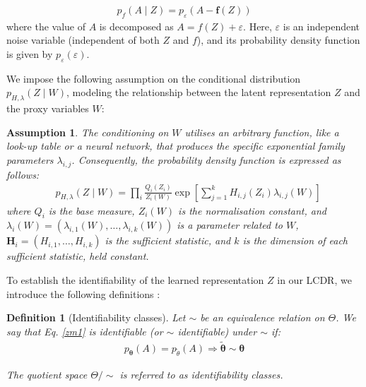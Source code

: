 \documentclass[sigconf]{acmart}
\newtheorem{assumption}{Assumption}		%
\newtheorem{definition}{Definition}
\begin{document}
\begin{equation}
\begin{split}
\label{zm2}
p_f\left({A} \mid {Z}\right)=p_{\varepsilon}\left({A}-\mathbf{f}({Z})\right)
\end{split}
\end{equation}
where the value of \( {A} \) is decomposed as \( {A} = f({Z}) + \varepsilon \). Here, \( \varepsilon \) is an independent noise variable (independent of both \( {Z} \) and \( f \)), and its probability density function is given by \( p_{\varepsilon}(\varepsilon) \).


We impose the following assumption on the conditional distribution $p_{H, \lambda}({Z} \mid {W})$, modeling the relationship between the latent representation $Z$ and the proxy variables $W$:

\begin{assumption}
\label{assumption 1}
The conditioning on ${W}$ utilises an arbitrary function, like a look-up table or a neural network, that produces the specific exponential family parameters $\lambda_{i, j}$. Consequently, the probability density function is expressed as follows:
\begin{equation}
\begin{split}
\label{zm3}
& p_{H, \lambda}({Z} \mid {W})= \prod_i \frac{Q_i\left({Z}_{i}\right)}{Z_i({W})} \exp \left[\sum_{j=1}^k H_{i, j}\left({Z}_{i}\right) \lambda_{i, j}({W})\right]
\end{split}
\end{equation}
where $Q_i$ is the base measure, $Z_i({W})$ is the normalisation constant, and $\lambda_i({W})=\left(\lambda_{i, 1}({W}), \ldots, \lambda_{i, k}({W})\right)$ is a parameter related to ${W}$, $\mathbf{H}_i=\left(H_{i, 1}, \ldots, H_{i, k}\right)$ is the sufficient statistic, and $k$ is the dimension of each sufficient statistic, held constant. 
\end{assumption}

To establish the identifiability of the learned representation ${Z}$ in our LCDR, we introduce the following definitions \cite{9}:

\begin{definition} [Identifiability classes]
\label{Definition 2}
Let $\sim$ be an equivalence relation on $\Theta$. We say that Eq. \eqref{zm1} is identifiable (or $\sim$ identifiable) under $\sim$ if:
\begin{equation}
\begin{split}
p_{\mathbf{\theta}}({A})=p_{\tilde{\theta}}({A}) \Longrightarrow \tilde{\mathbf{\theta}} \sim \mathbf{\theta}
\end{split}
\end{equation}

The quotient space $\Theta / \sim$ is referred to as identifiability classes.
\end{definition}
\end{document}
